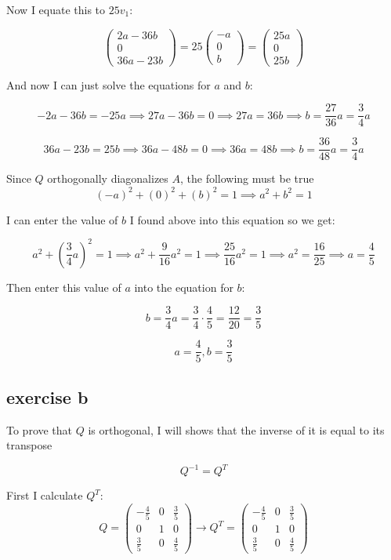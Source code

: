 \documentclass[11pt, a4paper]{article}
\begin{document}
Now I equate this to $25v_1$:

\[
\begin{pmatrix}
	2a - 36b \\
	0 \\
	36a - 23b
\end{pmatrix} = 25 \begin{pmatrix}
	-a \\
	0 \\
	b
\end{pmatrix} = \begin{pmatrix}
	25a \\
	0 \\
	25b
\end{pmatrix}
\]

And now I can just solve the equations for $a$ and $b$:

\[
-2a - 36b = -25a \implies 27a - 36b = 0 \implies 27a = 36b \implies b = \frac{27}{36}a = \frac{3}{4}a
\]

\[
36a - 23b = 25b \implies 36a - 48b = 0 \implies 36a = 48b \implies b = \frac{36}{48}a = \frac{3}{4}a
\]

Since $Q$ orthogonally diagonalizes $A$, the following must be true
\[
	{(-a)}^2 + {(0)}^2 + {(b)}^2 = 1 \implies a^2 + b^2 = 1
\]

I can enter the value of $b$ I found above into this equation so we get:

\[
a^2 + {\left(\frac{3}{4}a\right)}^2 = 1 \implies a^2 + \frac{9}{16}a^2 = 1 \implies \frac{25}{16}a^2 = 1 \implies a^2 = \frac{16}{25} \implies a = \frac{4}{5}
\]

Then enter this value of $a$ into the equation for $b$:

\[b = \frac{3}{4}a =  \frac{3}{4} \cdot \frac{4}{5} = \frac{12}{20} = \frac{3}{5}\]


\[
\boxed{a = \frac{4}{5}, b = \frac{3}{5}}
\]



\subsection*{exercise b}

To prove that $Q$ is orthogonal, I will shows that the inverse of it is equal to its transpose

\[
Q^{-1} = Q^T
\]

First I calculate $Q^T$:
\[
Q = 
\begin{pmatrix}
	-\frac{4}{5} & 0 & \frac{3}{5} \\
	0 & 1 & 0 \\
	\frac{3}{5} & 0 & \frac{4}{5}
\end{pmatrix} \xrightarrow{}
Q^T = 
\begin{pmatrix}
	-\frac{4}{5} & 0 & \frac{3}{5} \\
	0 & 1 & 0 \\
	\frac{3}{5} & 0 & \frac{4}{5}
\end{pmatrix}
\]
\end{document}

